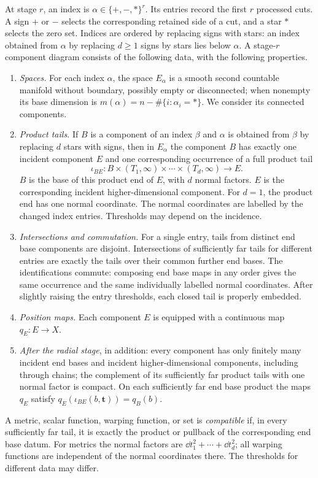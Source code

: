 \begin{definition}\label{component:category}
At stage $r$, an index is $\alpha\in\{+,-,*\}^{r}$.
Its entries record the first $r$ processed cuts.
A sign $+$ or $-$ selects the corresponding retained side of a cut,
and a star $*$ selects the zero set.
Indices are ordered by replacing signs with stars: an index obtained
from $\alpha$ by replacing $d\ge1$ signs by stars lies below $\alpha$.
A stage-$r$ component diagram consists of the following data, with the
following properties.
\begin{enumerate}[label=(\roman*),leftmargin=*]
\item \emph{Spaces.} For each index $\alpha$, the space $E_\alpha$ is a
smooth second countable manifold without boundary,
possibly empty or disconnected; when nonempty its base dimension is
$m(\alpha)=n-\#\{i:\alpha_i=*\}$.  We consider its connected components.
\item \emph{Product tails.}
If $B$ is a component of an index $\beta$ and $\alpha$ is obtained from $\beta$
by replacing $d$ stars with signs, then in $E_\alpha$ the component $B$ has
exactly one incident component $E$ and
one corresponding occurrence of a full product tail
\begin{equation}\label{component:tail}
 \iota_{BE}:B\times(T_1,\infty)\times\cdots\times(T_d,\infty)
       \longrightarrow E.
\end{equation}
\(B\) is the base of this product end of \(E\), with \(d\) normal factors.
\(E\) is the corresponding incident higher-dimensional component.
For \(d=1\), the product end has one normal coordinate.
The normal coordinates are labelled by the changed index entries.
Thresholds may depend on the incidence.
\item \emph{Intersections and commutation.} For a single entry, tails
from distinct end base components are disjoint.  Intersections of sufficiently
far tails for different entries are exactly the tails over their common
further end bases.  The identifications commute: composing end base maps in
any order gives the same occurrence and the same individually labelled
normal coordinates.  After slightly raising the entry thresholds,
each closed tail is properly embedded.
\item \emph{Position maps.} Each component $E$ is equipped with a continuous
map $q_E:E\to X$.
\item \emph{After the radial stage}, in addition:
every component has only finitely many incident end bases and incident higher-dimensional components, including
through chains; the complement of its sufficiently far product tails with one normal factor
is compact.  On each sufficiently far end base product the maps $q_E$ satisfy
$q_E(\iota_{BE}(b,\mathbf t))=q_B(b)$.
\end{enumerate}
A metric, scalar function, warping function, or set is \emph{compatible} if, in every
sufficiently far tail, it is exactly the product or pullback of the
corresponding end base datum.  For metrics the normal factors are
$\dd t_1^2+\cdots+\dd t_d^2$; all warping functions are independent of the normal
coordinates there.  The thresholds for different data may differ.
\end{definition}

